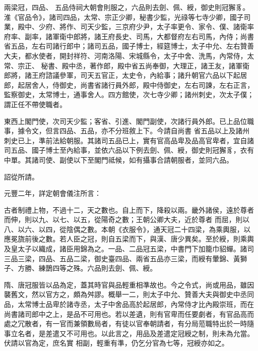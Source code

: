 \begin{pinyinscope}
 兩梁冠，四品、
 五品侍祠大朝會則服之，六品則去劍、佩、綬，御史則冠獬豸。淮《官品令》，諸司四品，太常、宗正少卿，秘書少監，光祿等七寺少卿，國子司業，殿中、少府、將作、司天少監，三京府少尹，太子率更令、家令、僕、諸衛率府率、副率，諸軍衛中郎將，諸王府長史、司馬，大都督府左右司馬，內侍；尚書省五品，左右司諸行郎中；諸司五品，國子博士，經筵博士，太子中允、左右贊善大夫，都水使者，開封祥符、河南洛陽、宋城縣令，太子中舍、洗馬，內常侍，太常、宗正、
 秘書、殿中丞，著作郎，殿中省五尚奉御，大理正，諸王友，諸軍衛郎將，諸王府諮議參軍，司天五官正，太史令，內給事；諸升朝官六品以下起居郎，起居舍人，侍御史，尚書省諸行員外郎，殿中侍御史，左右司諫，左右正言，監察御史，太常博士，通事舍人。四方館使，次七寺少卿；諸州刺史，次太子僕；謂正任不帶使職者。



 東西上閣門使，次司天少監；客省、引進、閣門副使，次諸行員外郎。已上品位職事，據令文，但言四品、五品，亦不分班敘上下。今請自尚書
 省五品以上及諸州刺史已上，準前法給朝服。其諸司五品已上，實有官高品卑及品高官卑者，宜自諸司五品、國子博士至內給事，並依六品以下例去劍、佩、綬，御史則冠獬豸，衣有中單。其諸司使、副使以下至閣門祗候，如有攝事合請朝服者，並同六品。



 詔從所請。



 元豐二年，詳定朝會儀注所言：



 古者制禮上物，不過十二，天之數也。自上而下，降殺以兩。畿外諸侯，遠於尊者而伸，則以九、以七、以五，從陽奇之數；王朝公卿大夫，近於尊者
 而屈，則以八、以六、以四，從陰偶之數。本朝《衣服令》，通天冠二十四梁，為乘輿服，以應冕旒前後之數。若人臣之冠，則自五梁而下，與漢、唐少異矣。至於綬，則乘輿及皇太子以織成，諸臣用錦為之。一品、二品冠五梁，中書門下加籠巾貂蟬。諸司三品三梁，四品、五品二梁，御史臺四品、兩省五品亦三梁，而綬有暈錦、黃獅子、方勝、練鵲四等之殊。六品則去劍、佩、綬。



 隋、唐冠服皆以品為定，蓋其時官與品輕重相準故也。今之令式，尚或用品，雖因
 襲舊文，然以官方之，頗為舛謬。概舉一二，則太子中允、贊善大夫與御史中丞同品，太常博士品卑於諸寺丞，太子中舍品高於起居郎，內常侍才比內殿崇班，而在尚書諸司郎中之上，是品不可用也。若以差遺，則有官卑而任要劇者，有官品高而處之冗散者，有一官而兼領數局者，有徒以官奉朝請者，有分局蒞職特出於一時隨事立名者，是差遣又不可用也。以此言之，用品及差遣定冠綬之制，則未為允當。伏請以官為定，庶名實
 相副，輕重有準，仍乞分官為七等，冠綬亦如之。




\end{pinyinscope}
